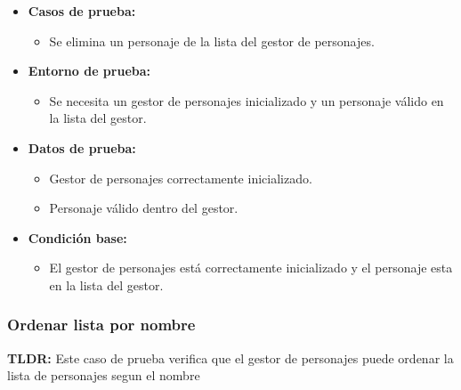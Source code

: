 \documentclass{article}
\begin{document}
\begin{itemize}
	\item \textbf{Casos de prueba:}
	\begin{itemize}
		\item Se elimina un personaje de la lista del gestor de personajes.
	\end{itemize}
	
	\item \textbf{Entorno de prueba:}
	\begin{itemize}
		\item Se necesita un gestor de personajes inicializado y un personaje válido en la lista del gestor.
	\end{itemize}
	
	\item \textbf{Datos de prueba:}
	\begin{itemize}
		\item Gestor de personajes correctamente inicializado.
		\item Personaje válido dentro del gestor.
	\end{itemize}
	
	\item \textbf{Condición base:}
	\begin{itemize}
		\item El gestor de personajes está correctamente inicializado y el personaje esta en la lista del gestor.
	\end{itemize}
	
\end{itemize}

\subsubsection{Ordenar lista por nombre}
\textbf{TLDR:} Este caso de prueba verifica que el gestor de personajes puede ordenar la lista de personajes segun el nombre 
\end{document}
